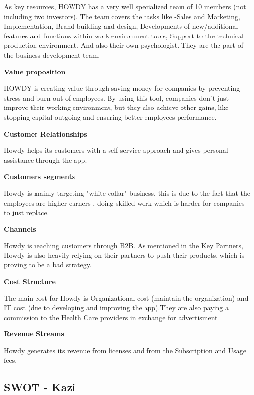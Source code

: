 \noindent As key resources, HOWDY has a very well specialized team of 10 members (not including two investors). The team covers the tasks like -Sales and Marketing, Implementation, Brand building and design, Developments of new/additional features and functions within work environment tools, Support to the technical production environment. And also their own psychologist. They are the part of the business development team.

\noindent \textbf{Value proposition}

\noindent HOWDY is creating value through saving money for companies by preventing stress and burn-out of employees. By using this tool, companies don ́t just improve their working environment, but they also achieve other gains, like stopping capital outgoing and ensuring better employees performance.

\noindent \textbf{Customer Relationships}

\noindent Howdy helps its customers with a self-service approach and gives personal assistance through the app.

\noindent \textbf{Customers segments}

\noindent Howdy is mainly targeting "white collar" business, this is due to the fact that the employees are higher earners , doing skilled work which is harder for companies to just replace.

\noindent \textbf{Channels}

\noindent Howdy is reaching customers through B2B. As mentioned in the Key Partners, Howdy is also heavily relying on their partners to push their products, which is proving to be a bad strategy. 

\noindent \textbf{Cost Structure}

\noindent The main cost for Howdy is Organizational cost (maintain the organization) and IT cost (due to developing and improving the app).They are also paying a commission to the Health Care providers in exchange for advertisment. 

\noindent \textbf{Revenue Streams}

\noindent Howdy generates its revenue from licenses and from the Subscription and Usage fees.



\subsection{SWOT - Kazi}

